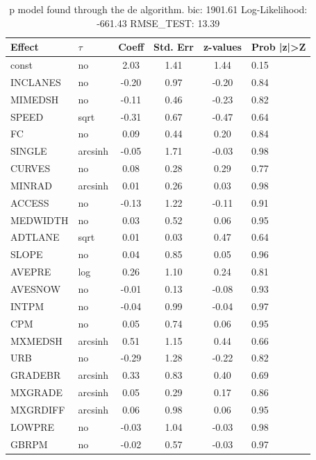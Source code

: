 \begin{table}
	\caption{p model found through the de algorithm. bic: 1901.61 Log-Likelihood: -661.43 RMSE_TEST: 13.39}
	\begin{center}
		\begin{tabular}{|l|l|c|c|c|l|}
			\hline
			Effect & $\tau$ & Coeff & Std. Err & z-values & Prob |z|>Z \\
			\hline
			const & no & 2.03 & 1.41 & 1.44 & 0.15 \\
			\hline
			INCLANES & no & -0.20 & 0.97 & -0.20 & 0.84 \\
			\hline
			MIMEDSH & no & -0.11 & 0.46 & -0.23 & 0.82 \\
			\hline
			SPEED & sqrt & -0.31 & 0.67 & -0.47 & 0.64 \\
			\hline
			FC & no & 0.09 & 0.44 & 0.20 & 0.84 \\
			\hline
			SINGLE & arcsinh & -0.05 & 1.71 & -0.03 & 0.98 \\
			\hline
			CURVES & no & 0.08 & 0.28 & 0.29 & 0.77 \\
			\hline
			MINRAD & arcsinh & 0.01 & 0.26 & 0.03 & 0.98 \\
			\hline
			ACCESS & no & -0.13 & 1.22 & -0.11 & 0.91 \\
			\hline
			MEDWIDTH & no & 0.03 & 0.52 & 0.06 & 0.95 \\
			\hline
			ADTLANE & sqrt & 0.01 & 0.03 & 0.47 & 0.64 \\
			\hline
			SLOPE & no & 0.04 & 0.85 & 0.05 & 0.96 \\
			\hline
			AVEPRE & log & 0.26 & 1.10 & 0.24 & 0.81 \\
			\hline
			AVESNOW & no & -0.01 & 0.13 & -0.08 & 0.93 \\
			\hline
			INTPM & no & -0.04 & 0.99 & -0.04 & 0.97 \\
			\hline
			CPM & no & 0.05 & 0.74 & 0.06 & 0.95 \\
			\hline
			MXMEDSH & arcsinh & 0.51 & 1.15 & 0.44 & 0.66 \\
			\hline
			URB & no & -0.29 & 1.28 & -0.22 & 0.82 \\
			\hline
			GRADEBR & arcsinh & 0.33 & 0.83 & 0.40 & 0.69 \\
			\hline
			MXGRADE & arcsinh & 0.05 & 0.29 & 0.17 & 0.86 \\
			\hline
			MXGRDIFF & arcsinh & 0.06 & 0.98 & 0.06 & 0.95 \\
			\hline
			LOWPRE & no & -0.03 & 1.04 & -0.03 & 0.98 \\
			\hline
			GBRPM & no & -0.02 & 0.57 & -0.03 & 0.97 \\

\end{tabular}
\end{center}
\end{table}
